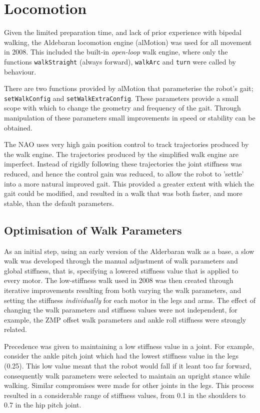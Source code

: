 %



\section{Locomotion}
Given the limited preparation time, and lack of prior experience with bipedal walking, the Aldebaran locomotion engine (alMotion) was used for all movement in 2008. This included the built-in \emph{open-loop} walk engine, where only the functions \texttt{walkStraight} (always forward), \texttt{walkArc} and \texttt{turn} were called by behaviour. 

There are two functions provided by alMotion that parameterise the robot's gait; \texttt{setWalkConfig} and \texttt{setWalkExtraConfig}. These parameters provide a small scope with which to change the geometry and frequency of the gait. Through manipulation of these parameters small improvements in speed or stability can be obtained.

The NAO uses very high gain position control to track trajectories produced by the walk engine. The trajectories produced by the simplified walk engine are imperfect. Instead of rigidly following these trajectories the joint stiffness was reduced, and hence the control gain was reduced, to allow the robot to 'settle' into a more natural improved gait. This provided a greater extent with which the gait could be modified, and resulted in a walk that was both faster, and more stable, than the default parameters. 

\subsection{Optimisation of Walk Parameters}

As an initial step, using an early version of the Alderbaran walk as a base, a slow walk was developed through the manual adjustment of walk parameters and global stiffness, that is, specifying a lowered stiffness value that is applied to every motor. The low-stiffness walk used in 2008 was then created through iterative improvements resulting from both varying the walk parameters, and setting the stiffness \emph{individually} for each motor in the legs and arms. The effect of changing the walk parameters and stiffness values were not independent, for example, the ZMP offset walk parameters and ankle roll stiffness were strongly related. 

Precedence was given to maintaining a low stiffness value in a joint. For example, consider the ankle pitch joint which had the lowest stiffness value in the legs (0.25). This low value meant that the robot would fall if it leant too far forward, consequently walk parameters were selected to maintain an upright stance while walking. Similar compromises were made for other joints in the legs. This process resulted in a considerable range of stiffness values, from 0.1 in the shoulders to 0.7 in the hip pitch joint.

